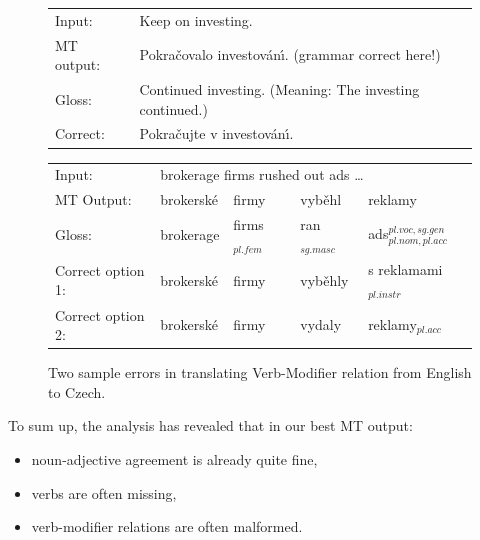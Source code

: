 \documentclass[11pt]{book}
\theoremstyle{plain}
\begin{document}
\begin{figure}

\begin{center}
{\small
\begin{tabular}{|ll|}
\hline
Input:      &  {Keep on investing.}\\
MT output:  &  Pokra\v{c}ovalo investov\'{a}n\'{\i}. (grammar correct here!)\\
Gloss:      &  Continued investing. (Meaning: The investing continued.)\\
Correct:    &  {Pokra\v{c}ujte v investov\'{a}n\'{\i}.}\\
\hline
\end{tabular}
}
\end{center}


\begin{center}
{
\small
\begin{tabular}{|lllll|}
\hline
Input:  &  \multicolumn{4}{l|}{brokerage firms rushed out ads \dots}\\
MT Output:  &  brokersk\'{e}  &  firmy  &  vyb\v{e}hl  &  reklamy\\
Gloss:  &  brokerage  &  firms$_{pl.fem}$  &  ran$_{sg.masc}$  &  ads$_{pl.nom,pl.acc}^{pl.voc,sg.gen}$\\
Correct option 1:  &  brokersk\'{e}  &  firmy  &  vyb\v{e}hly  &  s reklamami$_{pl.instr}$\\
Correct option 2:  &  brokersk\'{e}  &  firmy  &  vydaly  &  reklamy$_{pl.acc}$\\
\hline
\end{tabular}
}
\end{center}
\caption{Two sample errors in translating Verb-Modifier relation from English to
Czech.}
\label{sampleerrors}
\end{figure}







To sum up, the analysis has revealed that in our best MT output:

\begin{itemize}

\item noun-adjective agreement is already quite fine,

\item verbs are often missing,

\item verb-modifier relations are often malformed.
\end{itemize}
\end{document}
